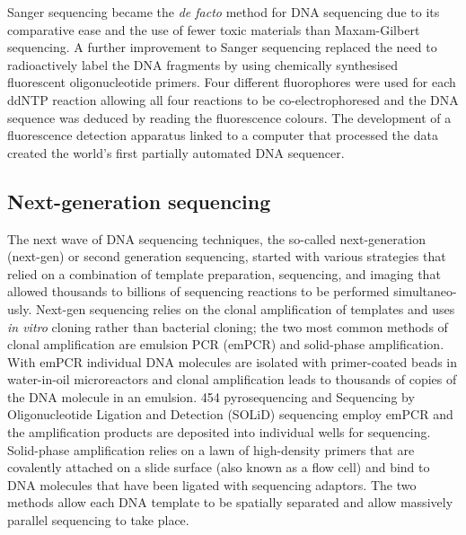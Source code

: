Sanger sequencing became the \textit{de facto} method for DNA sequencing due to its comparative ease and the use of fewer toxic materials than Maxam-Gilbert sequencing. A further improvement to Sanger sequencing replaced the need to radioactively label the DNA fragments by using chemically synthesised fluorescent oligonucleotide primers\cite{pmid3713851}. Four different fluorophores were used for each ddNTP reaction allowing all four reactions to be co-electrophoresed and the DNA sequence was deduced by reading the fluorescence colours. The development of a fluorescence detection apparatus linked to a computer that processed the data created the world's first partially automated DNA sequencer\cite{pmid3713851}.

\subsection{Next-generation sequencing}

The next wave of DNA sequencing techniques, the so-called next-generation (next-gen) or second generation sequencing, started with various strategies that relied on a combination of template preparation, sequencing, and imaging that allowed thousands to billions of sequencing reactions to be performed simultaneo-usly\cite{pmid19997069}. Next-gen sequencing relies on the clonal amplification of templates and uses \textit{in vitro} cloning rather than bacterial cloning; the two most common methods of clonal amplification are emulsion PCR (emPCR)\cite{pmid12857956} and solid-phase amplification\cite{pmid16473845}. With emPCR individual DNA molecules are isolated with primer-coated beads in water-in-oil microreactors and clonal amplification leads to thousands of copies of the DNA molecule in an emulsion. 454 pyrosequencing and Sequencing by Oligonucleotide Ligation and Detection (SOLiD) sequencing employ emPCR and the amplification products are deposited into individual wells for sequencing. Solid-phase amplification relies on a lawn of high-density primers that are covalently attached on a slide surface (also known as a flow cell) and bind to DNA molecules that have been ligated with sequencing adaptors. The two methods allow each DNA template to be spatially separated and allow massively parallel sequencing to take place.

